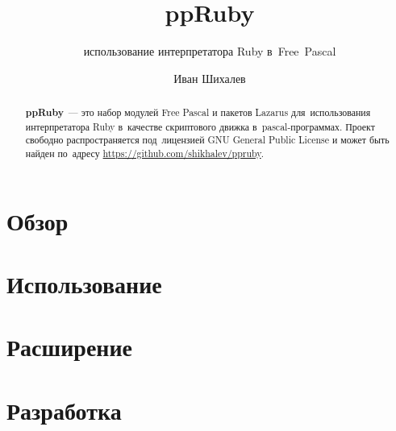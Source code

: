 \documentclass[a4paper,10pt,DIVcalc,final]{scrartcl}
\author{Иван Шихалев}
\title{ppRuby}
\subtitle{использование интерпретатора Ruby в Free Pascal}
\begin{document}
\maketitle

\begin{abstract}
\noindent\textsf{\textbf{ppRuby}} — это набор модулей Free Pascal и пакетов 
Lazarus для ис\-поль\-зо\-ва\-ния интерпретатора Ruby в качестве скриптового
движка в pascal-программах.
Проект свободно распространяется под лицензией GNU General Public License и 
может быть найден по адресу \url{https://github.com/shikhalev/ppruby}.
\end{abstract}

\tableofcontents

\section{Обзор}

\section{Использование}

\section{Расширение}

\section{Разработка}
\end{document}
